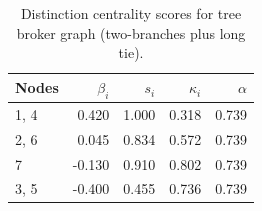 \begin{table}
\centering
\caption{\label{tab:treelong2}Distinction centrality scores for tree broker graph (two-branches plus long tie).}
\centering
\begin{tabular}[t]{lrrrr}
\toprule
Nodes & $\beta_i$ & $s_i$ & $\kappa_i$ & $\alpha$\\
\midrule
1, 4 & 0.420 & 1.000 & 0.318 & 0.739\\
2, 6 & 0.045 & 0.834 & 0.572 & 0.739\\
7 & -0.130 & 0.910 & 0.802 & 0.739\\
3, 5 & -0.400 & 0.455 & 0.736 & 0.739\\
\bottomrule
\end{tabular}
\end{table}

